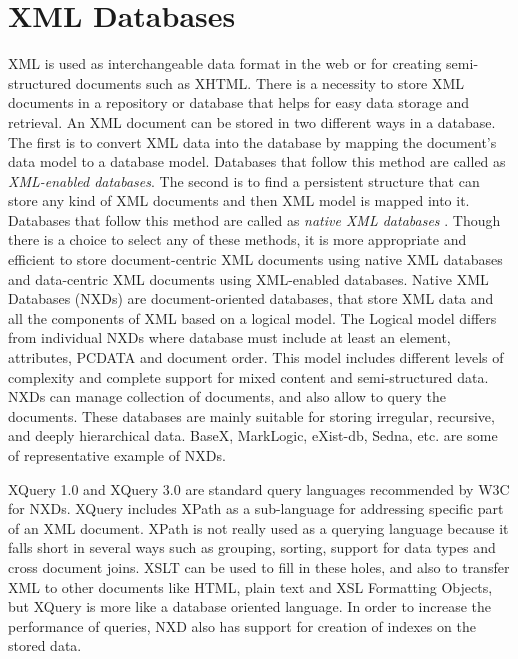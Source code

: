 \section{XML Databases}

  XML is used as interchangeable data format in the web or for creating semi-structured documents such as XHTML. There is a necessity to store XML documents in a repository or database that helps for easy data storage and retrieval. An XML document can be stored in two different ways in a database. The first is to convert XML data into the database by mapping the document's data model to a database model. Databases that follow this method are called as \textit{XML-enabled databases}. The second is to find a persistent structure that can store any kind of XML documents and then XML model is mapped into it. Databases that follow this method are called as \textit{native XML databases} \cite{pavlovic2007native}. Though there is a choice to select any of these methods, it is more appropriate and efficient to store document-centric XML documents using native XML databases and data-centric  XML documents using XML-enabled databases. Native XML Databases (NXDs) are document-oriented databases, that store XML data and all the components of XML based on a logical model. The Logical model differs from individual NXDs where database must include at least an element, attributes, PCDATA and document order. This model includes different levels of complexity and complete support for mixed content and semi-structured data. NXDs can manage collection of documents, and also allow to query the documents. These databases are mainly suitable for storing irregular, recursive, and deeply hierarchical data.  BaseX, MarkLogic, eXist-db, Sedna, etc. are some of representative example of NXDs. 
  \par XQuery 1.0 and XQuery 3.0 are standard query languages recommended by W3C for NXDs. XQuery includes XPath as a sub-language for addressing specific part of an XML document. XPath is not really used as a querying language because it falls short in several ways such as grouping, sorting, support for data types and cross document joins. XSLT can be used to fill in these holes, and also to transfer XML to other documents like HTML, plain text and XSL Formatting Objects, but XQuery is more like a database oriented language.  In order to increase the performance of queries, NXD also has support for creation of indexes on the stored data\cite{pavlovic2007native}.
